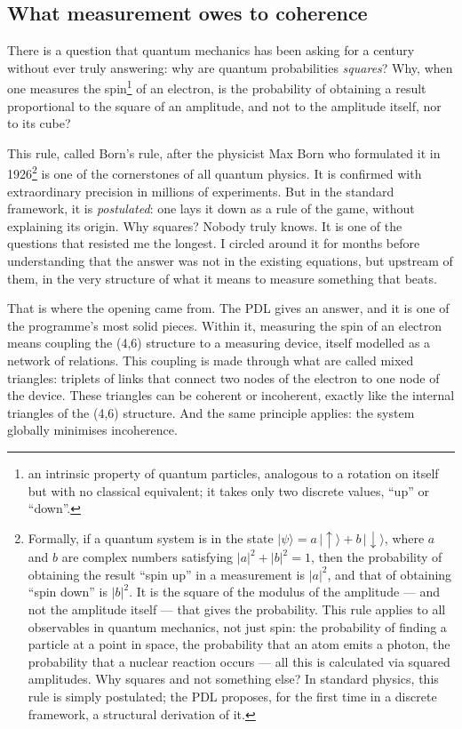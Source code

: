 \documentclass[11pt, a4paper, openright]{book}
\begin{document}
\subsection*{What measurement owes to coherence}

There is a question that quantum mechanics has been asking for a century without ever truly answering: why are quantum probabilities \emph{squares}? Why, when one measures the spin\footnote{an intrinsic property of quantum particles, analogous to a rotation on itself but with no classical equivalent; it takes only two discrete values, “up” or “down”.} of an electron, is the probability of obtaining a result proportional to the square of an amplitude, and not to the amplitude itself, nor to its cube?

\medskip

This rule, called Born’s rule, after the physicist Max Born who formulated it in 1926\footnote{%
    Formally, if a quantum system is in the state $|\psi\rangle = a\,|\!\uparrow\rangle + b\,|\!\downarrow\rangle$, where $a$ and $b$ are complex numbers satisfying $|a|^2 + |b|^2 = 1$, then the probability of obtaining the result “spin up” in a measurement is $|a|^2$, and that of obtaining “spin down” is $|b|^2$. It is the square of the modulus of the amplitude — and not the amplitude itself — that gives the probability. This rule applies to all observables in quantum mechanics, not just spin: the probability of finding a particle at a point in space, the probability that an atom emits a photon, the probability that a nuclear reaction occurs — all this is calculated via squared amplitudes. Why squares and not something else? In standard physics, this rule is simply postulated; the PDL proposes, for the first time in a discrete framework, a structural derivation of it.} 
is one of the cornerstones of all quantum physics. It is confirmed with extraordinary precision in millions of experiments. But in the standard framework, it is \emph{postulated}: one lays it down as a rule of the game, without explaining its origin. Why squares? Nobody truly knows. It is one of the questions that resisted me the longest. I circled around it for months before understanding that the answer was not in the existing equations, but upstream of them, in the very structure of what it means to measure something that beats.

\medskip

That is where the opening came from. The PDL gives an answer, and it is one of the programme’s most solid pieces. Within it, measuring the spin of an electron means coupling the (4,6) structure to a measuring device, itself modelled as a network of relations. This coupling is made through what are called mixed triangles: triplets of links that connect two nodes of the electron to one node of the device. These triangles can be coherent or incoherent, exactly like the internal triangles of the (4,6) structure. And the same principle applies: the system globally minimises incoherence.
\end{document}
